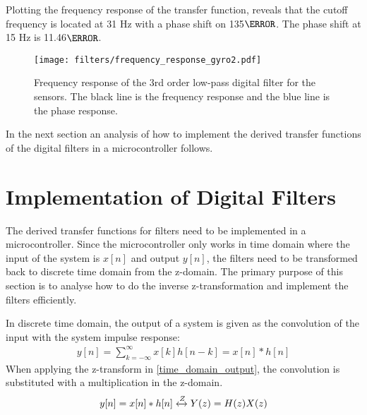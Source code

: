 Plotting the frequency response of the transfer function, reveals that the cutoff frequency is located at 31 Hz with a phase shift on 135$\degree$. The phase shift at 15 Hz is 11.46$\degree$.

\begin{figure}[H]
    \centering
    \texttt{[image: filters/frequency\_response\_gyro2.pdf]}
    \caption{Frequency response of the 3rd order low-pass digital filter for the sensors. The black line is the frequency response and the blue line is the phase response.}
    \label{fig:freq_response_sensor}
\end{figure} 
In the next section an analysis of how to implement the derived transfer functions of the digital filters in a microcontroller follows.
\section{Implementation of Digital Filters}
The derived transfer functions for filters need to be implemented in a microcontroller. Since the microcontroller only works in time domain where the input of the system is $x[n]$ and output $y[n]$, the filters need to be transformed back to discrete time domain from the z-domain. The primary purpose of this section is to analyse how to do the inverse z-transformation and implement the filters efficiently.

In discrete time domain, the output of a system is given as the convolution of the input with the system impulse response:
\begin{align}
y[n] = \sum\limits_{k=-\infty}^{\infty}x[k] h[n-k] = x[n]*h[n]
\label{time_domain_output}
\end{align}
When applying the z-transform in \autoref{time_domain_output}, the convolution is substituted with a multiplication in the z-domain.
\begin{align}
y[n] = x[n]*h[n] \xleftrightarrow{Z} Y(z) = H(z) X(z)
\label{z_domain}
\end{align}
\begin{where}
\\
\\
\\
\end{where}

